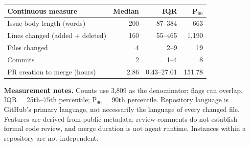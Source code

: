 \begin{table}[H]
\begin{tabularx}{\linewidth}{@{}Yr@{}}
\bottomrule
\end{tabularx}
\medskip
\begin{tabularx}{\linewidth}{@{}Yrrr@{}}
\toprule
\textbf{Continuous measure} & \textbf{Median} & \textbf{IQR} & \textbf{P$_{90}$}\\
\midrule
Issue body length (words) & 200 & 87--384 & 663\\
Lines changed (added + deleted) & 160 & 55--465 & 1,190\\
Files changed & 4 & 2--9 & 19\\
Commits & 2 & 1--4 & 8\\
PR creation to merge (hours) & 2.86 & 0.43--27.01 & 151.78\\
\bottomrule
\end{tabularx}
\par\smallskip\raggedright\scriptsize
\textbf{Measurement notes.} Counts use 3,809 as the denominator; flags can overlap. IQR = 25th--75th percentile; P$_{90}$ = 90th percentile. Repository language is GitHub's primary language, not necessarily the language of every changed file. Features are derived from public metadata; review comments do not establish formal code review, and merge duration is not agent runtime. Instances within a repository are not independent.
\end{table}


